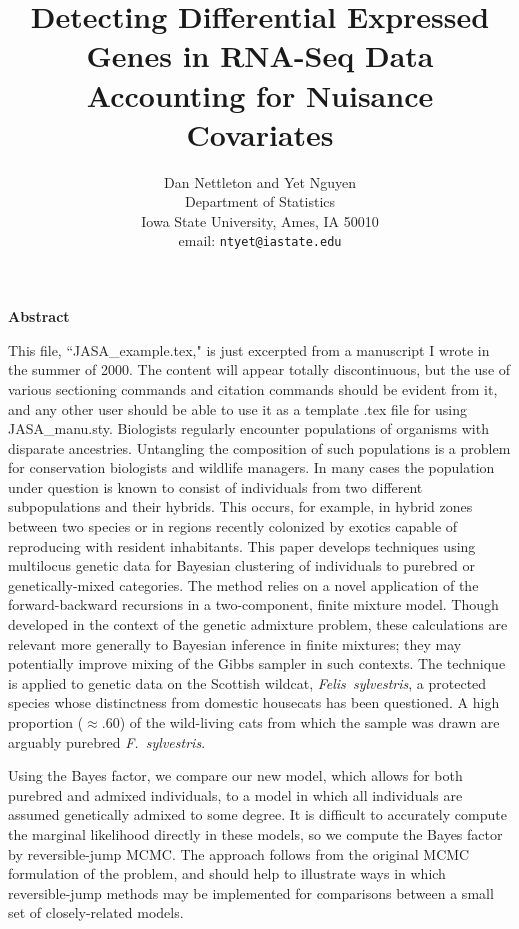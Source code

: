 \documentclass[11pt]{article}
\begin{document}
\title{Detecting Differential Expressed Genes in RNA-Seq Data \\ 
Accounting for Nuisance Covariates}
\author{Dan Nettleton  and Yet Nguyen\\
Department of Statistics \\ 
Iowa State University, Ames, IA 50010\\ 
email: \texttt{ntyet@iastate.edu} }

\maketitle



\newpage
\begin{center}
\textbf{Abstract}
\end{center}

This file, ``JASA\_example.tex," is just excerpted from a manuscript I wrote in the summer of 2000.
The content will appear totally discontinuous, but the use of various sectioning commands and citation commands should be
evident from it, and any other user should be able to use it as a template .tex file for using 
JASA\_manu.sty.  
Biologists regularly encounter populations of organisms with disparate ancestries.  Untangling the
composition of such populations is a problem for conservation biologists and wildlife
managers.  In many cases the population under question is known to consist of individuals from two
different subpopulations and their hybrids.  This occurs, for example, in hybrid zones between two species or
in regions recently colonized by exotics capable of reproducing with resident inhabitants.  This paper develops
techniques using multilocus genetic data for Bayesian clustering of individuals to purebred or
genetically-mixed categories.  The method relies on a novel application of the forward-backward recursions
in a two-component, finite mixture model.  Though developed in the context of the genetic
admixture problem, these calculations are relevant more generally to Bayesian inference in finite mixtures; they may
potentially improve mixing of the Gibbs sampler in such contexts.  
The technique is applied to genetic data on the Scottish wildcat, {\em Felis~sylvestris}, a protected species
whose distinctness from domestic housecats has been questioned.  A high proportion ($\approx .60$) of the
wild-living cats from which the sample was drawn are arguably purebred {\em F.~sylvestris}.  

Using the Bayes factor, we compare our new model, which allows for both purebred and admixed individuals, to
a model in which all individuals are assumed genetically admixed to some degree.  It is difficult to accurately compute
the marginal likelihood directly in these models, so we compute the Bayes factor by reversible-jump MCMC\@. The approach
follows from the original MCMC formulation of the problem, and should help to illustrate ways in which
reversible-jump methods may be implemented for comparisons between a small set of closely-related models.   
\end{document}

